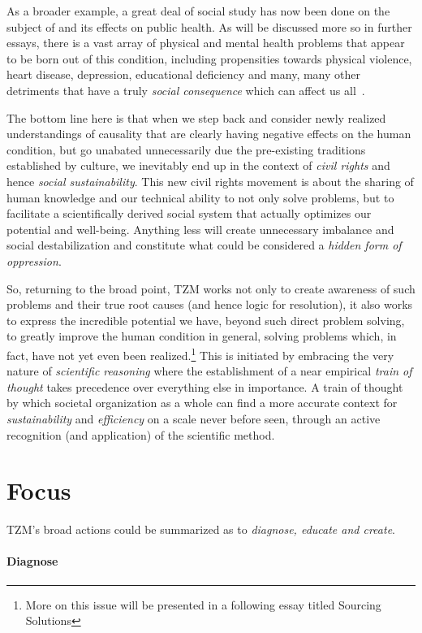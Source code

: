 \documentclass[10pt, a4paper, cleardoubleempty, openright, twoside]{book}
\begin{document}
As a broader example, a great deal of social study has now been done on
the subject of  and its effects on public
health. As will be discussed more so in further essays, there is a vast
array of physical and mental health problems that appear to be born out
of this condition, including propensities towards physical violence,
heart disease, depression, educational deficiency and many, many other
detriments that have a truly \emph{social consequence} which can affect
us all~\cite{Wilkinson::10}.

The bottom line here is that when we step back and consider newly
realized understandings of causality that are clearly having negative
effects on the human condition, but go unabated unnecessarily due the
pre-existing traditions established by culture, we inevitably end up in
the context of \emph{civil rights} and hence \emph{social
sustainability}. This new civil rights movement is about the sharing of
human knowledge and our technical ability to not only solve problems,
but to facilitate a scientifically derived social system that actually
optimizes our potential and well-being. Anything less will create
unnecessary imbalance and social destabilization and constitute what
could be considered a \emph{hidden form of oppression}.

So, returning to the broad point, TZM works not only to create awareness
of such problems and their true root causes (and hence logic for
resolution), it also works to express the incredible potential we have,
beyond such direct problem solving, to greatly improve the human
condition in general, solving problems which, in fact, have not yet even
been realized.\footnote{
	More on this issue will be presented in a following essay titled
	Sourcing Solutions	
}
This is initiated by embracing the very nature of \emph{scientific
reasoning} where the establishment of a near empirical \emph{train of
thought} takes precedence over everything else in importance. A train of
thought by which societal organization as a whole can find a more
accurate context for \emph{sustainability} and \emph{efficiency} on a
scale never before seen, through an active recognition (and application)
of the scientific method.

\section {Focus}
TZM's broad actions could be summarized as to \emph{diagnose, educate and
create}.

\paragraph {Diagnose}
\end{document}
